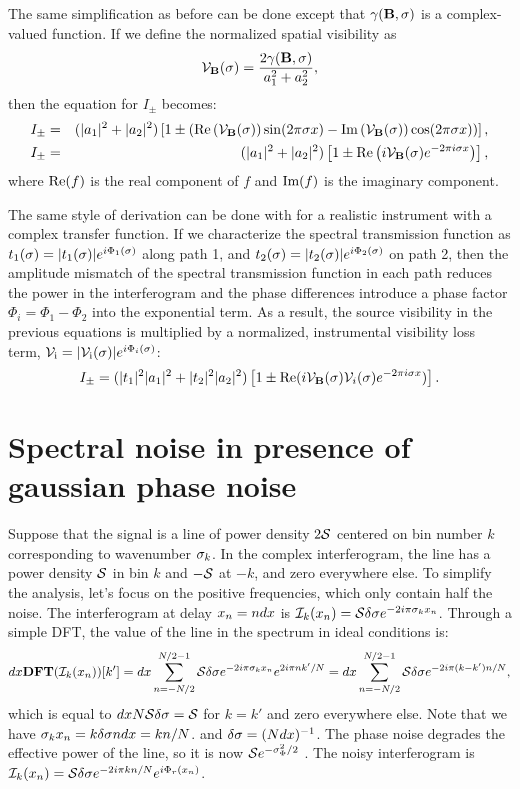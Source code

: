 The same simplification as before can be done except that $\gamma(\baseline,\s)$ is a complex-valued function. If we define the normalized spatial
visibility as
\begin{equation}
\Vb(\s) = {2\gamma(\baseline,\s)\over a_1^2 + a_2^2},
\end{equation}
then the equation for $I_\pm$ becomes:
\begin{eqnarray}
I_\pm & = & ( |a_1|^2 + |a_2|^2 ) \left[ 1 \pm (\real\left(\Vb(\s)\right) \sin(2 \pi \s x) - \imag\left(\Vb(\s)\right) \cos(2 \pi \s x))\right],\\
I_\pm & = & ( |a_1|^2 + |a_2|^2 ) \left[ 1 \pm \real\left( i \Vb(\s) e^{-2 \pi i \s x}\right)\right],
\end{eqnarray}
where $\real(f)$ is the real component of $f$ and $\imag(f)$ is the imaginary component.

The same style of derivation can be done with for a realistic instrument with a complex transfer function.  If
we characterize the spectral transmission function as $t_1(\s) = |t_1(\s)| e^{i\Phi_1(\s)} $ along path 1, and
$t_2(\s) = |t_2(\s)| e^{i\Phi_2(\s)} $ on path 2, then the amplitude mismatch of the spectral transmission function in each path reduces the power in the interferogram and
the phase differences introduce a phase factor $\Phi_{i} = \Phi_1 - \Phi_2$ into the exponential term.
As a result, the source visibility in the previous equations is multiplied by a normalized, instrumental visibility loss term, $\Vi = |\Vi(\s)|e^{i\Phi_i(\s)}$:
\begin{equation}
I_\pm = ( |t_1|^2 |a_1|^2 + |t_2|^2 |a_2|^2 ) \left[ 1 \pm \real( i \Vb(\s)\V_i(\s) e^{-2 \pi i \s x})\right].
\end{equation}


\section{Spectral noise in presence of gaussian phase noise}
\label{ap:phasenoise}

Suppose that the signal is a line of power density $2\S$ centered on bin number $k$ corresponding to wavenumber $\s_k$. In the complex interferogram, the line has a power density $\S$ in bin $k$ and $-\S$ at $-k$, and zero everywhere else. To simplify the analysis, let's focus on the positive frequencies, which only contain half the noise. The interferogram at delay $\xn = n\Dx$ is $\Ikxn =\S\dsig e^{-2i\pi \s_k\xn}$. Through a simple DFT, the value of the line in the spectrum in ideal conditions is:
\begin{equation}
\Dx\DFT(\Ikxn)[k'] = \Dx\sum_{n=-N/2}^{N/2-1}\S\dsig e^{-2i\pi \s_k\xn }e^{2i\pi n k'/N} = \Dx\sum_{n=-N/2}^{N/2-1}\S\dsig e^{-2i\pi (k-k')n/N },
\end{equation}
which is equal to $\Dx N\S\dsig = \S$ for $k=k'$ and zero everywhere else.
Note that we have $\s_k\xn = k\dsig n\Dx = kn/N$. and $\dsig = (N\Dx)^{-1}$. The phase noise degrades the effective power of the line, so it is now $\S e^{-\varPhir/2}$ \citep{Richards:2003bp}. The noisy interferogram is $\Ikxn =\S\dsig e^{-2i\pi kn/N}e^{i\Phir\pxn}$.

